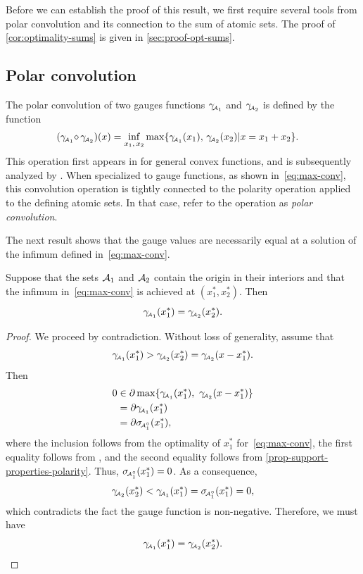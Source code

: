 Before we can establish the proof of this result, we first require several tools
from polar convolution and its connection to the sum of atomic sets. The proof
of \autoref{cor:optimality-sums} is given in \autoref{sec:proof-opt-sums}.


\subsection{Polar convolution}

The polar convolution of two gauges functions $\gamma_{\!\scriptscriptstyle\mathcal{A}_1}$ and $\gamma_{\!\scriptscriptstyle\mathcal{A}_2}$
is defined by the function
\begin{align}
  (\gamma_{\!\scriptscriptstyle\mathcal{A}_1}\!\mathop{\diamond}\gamma_{\!\scriptscriptstyle\mathcal{A}_2})(x)
  &= \inf_{x_1,\,x_2}\max\{\gamma_{\!\scriptscriptstyle\mathcal{A}_1}(x_1),\,\gamma_{\!\scriptscriptstyle\mathcal{A}_2}(x_2)|x=x_1+x_2\}.
    \label{eq:max-conv}
\end{align}
This operation first appears in \citet[Theorem~5.8]{rockafellar1970convex} for
general convex functions, and is subsequently analyzed by \citet{SeegerVolle95}.
When specialized to gauge functions, as shown in~\eqref{eq:max-conv}, this
convolution operation is tightly connected to the polarity operation applied to
the defining atomic sets. In that case, \citet{friedlander2019polarconvolution} refer
to the operation as \emph{polar convolution}.

The next result shows that the gauge values are necessarily equal at a solution
of the infimum defined in~\eqref{eq:max-conv}. 
\begin{lemma}
  \label{prop:balance-polar-convolution}
   Suppose that the sets $\mathcal{A}_1$ and $\mathcal{A}_2$ contain the origin in their
  interiors and that the infimum in~\eqref{eq:max-conv} is achieved at
  $(x_1^*, x_2^*)$. Then
  \[\gamma_{\!\scriptscriptstyle\mathcal{A}_1}(x_1^*) = \gamma_{\!\scriptscriptstyle\mathcal{A}_2}(x_2^*).\]
\end{lemma}

\begin{proof}
  We proceed by contradiction. Without loss of generality, assume that
  \[
    \gamma_{\!\scriptscriptstyle\mathcal{A}_1}(x_1^*) > \gamma_{\!\scriptscriptstyle\mathcal{A}_2}(x_2^*) = \gamma_{\!\scriptscriptstyle\mathcal{A}_2}(x - x_1^*).
  \]
  Then 
  \begin{align*}
    0 &\in \partial\max\{\gamma_{\!\scriptscriptstyle\mathcal{A}_1}(x_1^*),\ \gamma_{\!\scriptscriptstyle\mathcal{A}_2}(x-x_1^*)\}
    \\&= \partial\gamma_{\!\scriptscriptstyle\mathcal{A}_1}(x_1^*)
    \\&=  \partial\sigma_{\!\scriptscriptstyle\mathcal{A}_1^\circ}(x_1^*),
  \end{align*}
  where the inclusion follows from the optimality of $x_1^*$
  for~\eqref{eq:max-conv}, the first equality follows from
  \citet[Theorem~D.4.4.2]{hiriart-urruty01}, and the second equality follows
  from \autoref{prop-support-properties-polarity}. Thus, $\sigma_{\!\scriptscriptstyle\mathcal{A}_1^\circ}(x_1^*)=0$.
  As a consequence, 
  \[
    \gamma_{\!\scriptscriptstyle\mathcal{A}_2}(x_2^*) < \gamma_{\!\scriptscriptstyle\mathcal{A}_1}(x_1^*) = \sigma_{\!\scriptscriptstyle\mathcal{A}_1^\circ}(x_1^*) = 0,
  \]
  which contradicts the fact the gauge function is non-negative. Therefore, we
  must have 
  \[\gamma_{\!\scriptscriptstyle\mathcal{A}_1}(x_1^*) = \gamma_{\!\scriptscriptstyle\mathcal{A}_2}(x_2^*).\]
\end{proof}


